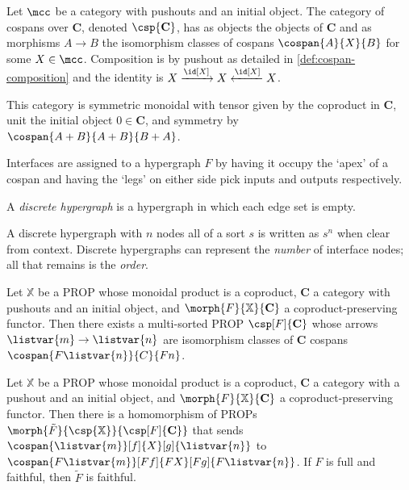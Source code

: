 \begin{definition}
    Let \(\mcc\) be a category with pushouts and an initial object.
    The category of cospans over \(\mathbf{C}\), denoted \(\csp{\mathbf{C}}\),
    has as objects the objects of \(\mathbf{C}\) and as morphisms \(A \to B\)
    the isomorphism classes of cospans \(\cospan{A}{X}{B}\) for some
    \(X \in \mcc\).
    Composition is by pushout as detailed in \cref{def:cospan-composition} and
    the identity is \(X \xrightarrow{\id[X]} X \xleftarrow{\id[X]} X\).

    This category is symmetric monoidal with tensor given by the coproduct in
    \(\mathbf{C}\), unit the initial object \(0 \in \mathbf{C}\), and symmetry
    by \(\cospan{A+B}{A+B}{B+A}\).
\end{definition}

Interfaces are assigned to a hypergraph \(F\) by having it occupy the `apex' of
a cospan and having the `legs' on either side pick inputs and outputs
respectively.

\begin{definition}
    A \emph{discrete hypergraph} is a hypergraph in which each edge set is
    empty.
\end{definition}

A discrete hypergraph with \(n\) nodes all of a sort \(s\) is written as \(s^n\)
when clear from context.
Discrete hypergraphs can represent the \emph{number} of interface nodes; all
that remains is the \emph{order}.

\begin{theorem}
    Let \(\mathbb{X}\) be a PROP whose monoidal product is a coproduct,
    \(\mathbf{C}\) a category with pushouts and an initial object, and \(
        \morph{F}{\mathbb{X}}{\mathbf{C}}
    \) a coproduct-preserving functor.
    Then there exists a multi-sorted PROP \(\csp[F]{\mathbf{C}}\) whose arrows
    \(\listvar{m} \to \listvar{n}\) are isomorphism classes of \(\mathbf{C}\)
    cospans \(\cospan{F\listvar{n}}{C}{Fn}\).
\end{theorem}

\begin{theorem}
    \label{thm:cospan-homomorphism}
    Let \(\mathbb{X}\) be a PROP whose monoidal product is a coproduct,
    \(\mathbf{C}\) a category with a pushout and an initial object, and
    \(\morph{F}{\mathbb{X}}{\mathbf{C}}\) a coproduct-preserving functor.
    Then there is a homomorphism of PROPs \(
        \morph{\tilde{F}}{\csp{\mathbb{X}}}{\csp[F]{\mathbf{C}}}
    \) that sends \(\cospan{\listvar{m}}[f]{X}[g]{\listvar{{n}}}\) to
    \(\cospan{F\listvar{m}}[Ff]{FX}[Fg]{F\listvar{n}}\).
    If \(F\) is full and faithful, then \(\tilde{F}\) is faithful.
\end{theorem}

